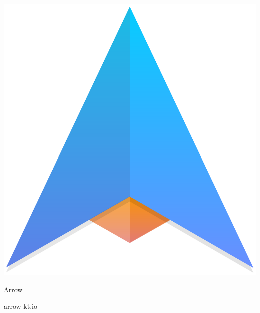 \documentclass[xcolor={dvipsnames}]{beamer}
\begin{document}
\begin{frame}

    \begin{center}
        \includegraphics{arrow}
    \end{center}

    \begin{center}
        \Huge{Λrrow}
    \end{center}

    \begin{center}
        \Huge{arrow-kt.io}
    \end{center}

\end{frame}
\end{document}
